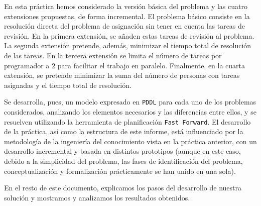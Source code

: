 En esta práctica hemos considerado la versión básica del problema y las cuatro 
extensiones propuestas, de forma incremental. El problema básico consiste en 
la resolución directa del problema de asignación sin tener en cuenta las 
tareas de revisión. En la primera extensión, se añaden estas tareas de 
revisión al problema. La segunda extensión pretende, además, minimizar el 
tiempo total de resolución de las tareas. En la tercera extensión se limita 
el número de tareas por programador a \(2\) para facilitar el trabajo en 
paralelo. Finalmente, en la cuarta extensión, se pretende minimizar la 
suma del número de personas con tareas asignadas y el tiempo total de 
resolución.

Se desarrolla, pues, un modelo expresado en \texttt{PDDL} para cada uno de los 
problemas considerados, analizando los elementos necesarios y las diferencias 
entre ellos, y se resuelven utilizando la herramienta de planificación 
\texttt{Fast Forward}. El desarrollo de la práctica, así como la estructura 
de este informe, está influenciado por la metodología de la ingeniería del 
conocimiento vista en la práctica anterior, con un desarrollo incremental y 
basada en distintos prototipos (aunque en este caso, debido a la simplicidad 
del problema, las fases de identificación del problema, conceptualización y 
formalización prácticamente se han unido en una sola).

En el resto de este documento, explicamos los pasos del desarrollo de nuestra 
solución y mostramos y analizamos los resultados obtenidos.

\clearpage


